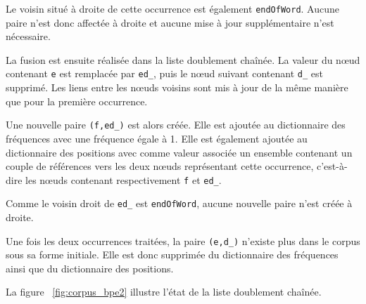 \documentclass[12pt,a4paper]{report}
\begin{document}
	Le voisin situé à droite de cette occurrence est également \texttt{endOfWord}. Aucune paire n’est donc affectée à droite et aucune mise à jour supplémentaire n’est nécessaire.
	
	La fusion est ensuite réalisée dans la liste doublement chaînée. La valeur du nœud contenant \texttt{e} est remplacée par \texttt{ed\_}, puis le nœud suivant contenant \texttt{d\_} est supprimé. Les liens entre les nœuds voisins sont mis à jour de la même manière que pour la première occurrence.
	
	Une nouvelle paire \texttt{(f,ed\_)} est alors créée. Elle est ajoutée au dictionnaire des fréquences avec une fréquence égale à 1. Elle est également ajoutée au dictionnaire des positions avec comme valeur associée un ensemble contenant un couple de références vers les deux nœuds représentant cette occurrence, c’est-à-dire les nœuds contenant respectivement \texttt{f} et \texttt{ed\_}.
	
	Comme le voisin droit de \texttt{ed\_} est \texttt{endOfWord}, aucune nouvelle paire n’est créée à droite.
	
	Une fois les deux occurrences traitées, la paire \texttt{(e,d\_)} n’existe plus dans le corpus sous sa forme initiale. Elle est donc supprimée du dictionnaire des fréquences ainsi que du dictionnaire des positions.
	
	La figure ~\ref{fig:corpus_bpe2} illustre l’état de la liste doublement chaînée.
	
\end{document}
